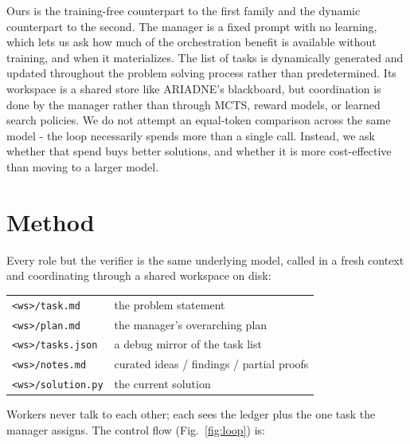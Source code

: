 \documentclass{article}
\begin{document}
Ours is the training-free counterpart to the first family and the dynamic counterpart to the
second. The manager is a fixed prompt with no learning, which lets us ask how much of the
orchestration benefit is available without training, and when it materializes. The list of tasks is dynamically generated and updated throughout the problem solving process rather than predetermined.
Its workspace is a shared store like ARIADNE's blackboard, but coordination is done by the manager
rather than through MCTS, reward models, or learned search policies. We do not attempt
an equal-token comparison across the same model - the loop necessarily spends more than a single call. 
Instead, we ask whether that spend buys better solutions, and whether it is more cost-effective than moving to a larger model.

\section{Method}
\label{sec:method}

Every role but the verifier is the same underlying model, called in a fresh context and
coordinating through a shared workspace on disk:

\begin{center}
\small
\begin{tabular}{@{}ll@{}}
\texttt{<ws>/task.md}     & the problem statement \\
\texttt{<ws>/plan.md}     & the manager's overarching plan \\
\texttt{<ws>/tasks.json}  & a debug mirror of the task list \\
\texttt{<ws>/notes.md}    & curated ideas / findings / partial proofs \\
\texttt{<ws>/solution.py} & the current solution \\
\end{tabular}
\end{center}

Workers never talk to each other; each sees the ledger plus the one task the manager
assigns. The control flow (Fig.~\ref{fig:loop}) is:
\end{document}
